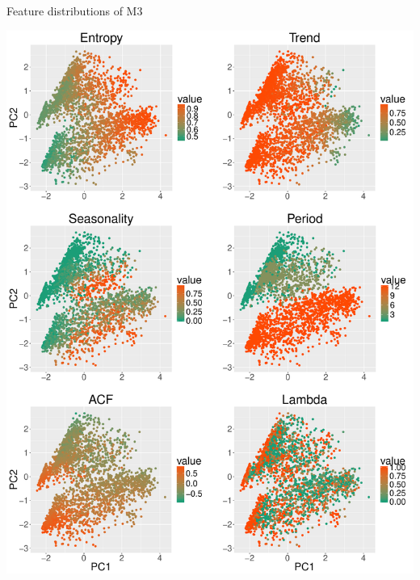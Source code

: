 \documentclass[12pt,ignorenonframetext,compress]{beamer}
\begin{document}
\begin{frame}{Feature distributions of M3}

\centerline{\includegraphics[width=\textwidth]{figures/FeatureDistribution.pdf}}

\end{frame}
\end{document}
